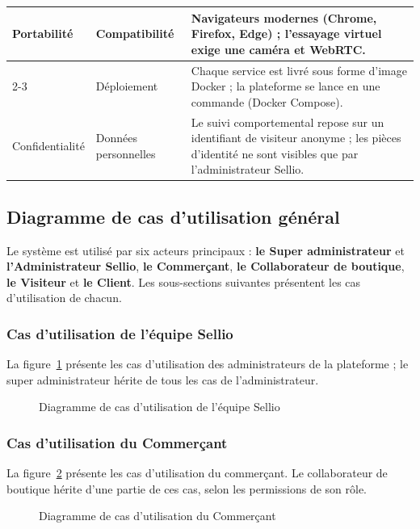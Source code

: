 \begin{longtable}{|p{3.2cm}|p{4cm}|p{8cm}|}
\hline
\multirow{2}{*}{Portabilité} & Compatibilité & Navigateurs modernes (Chrome, Firefox, Edge) ; l'essayage virtuel exige une caméra et WebRTC. \\
\cline{2-3}
 & Déploiement & Chaque service est livré sous forme d'image Docker ; la plateforme se lance en une commande (Docker Compose). \\
\hline
Confidentialité & Données personnelles & Le suivi comportemental repose sur un identifiant de visiteur anonyme ; les pièces d'identité ne sont visibles que par l'administrateur Sellio. \\
\hline
\end{longtable}

\subsection{Diagramme de cas d'utilisation général}
Le système est utilisé par six acteurs principaux : \textbf{le Super administrateur} et \textbf{l'Administrateur Sellio}, \textbf{le Commerçant}, \textbf{le Collaborateur de boutique}, \textbf{le Visiteur} et \textbf{le Client}. Les sous-sections suivantes présentent les cas d'utilisation de chacun.

\subsubsection{Cas d'utilisation de l'équipe Sellio}
La figure~\ref{fig:cu-admin} présente les cas d'utilisation des administrateurs de la plateforme ; le super administrateur hérite de tous les cas de l'administrateur.
\begin{figure}[H]
    \centering
    \caption{Diagramme de cas d'utilisation de l'équipe Sellio}
    \label{fig:cu-admin}
\end{figure}

\subsubsection{Cas d'utilisation du Commerçant}
La figure~\ref{fig:cu-commercant} présente les cas d'utilisation du commerçant. Le collaborateur de boutique hérite d'une partie de ces cas, selon les permissions de son rôle.
\begin{figure}[H]
    \centering
    \caption{Diagramme de cas d'utilisation du Commerçant}
    \label{fig:cu-commercant}
\end{figure}

